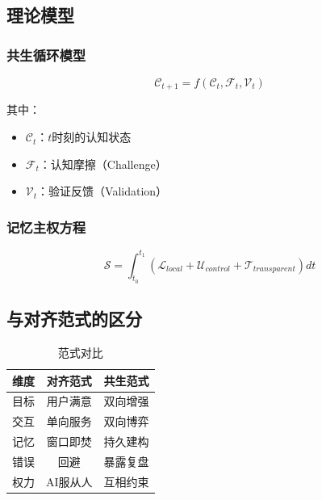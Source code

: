 \documentclass[12pt,a4paper]{article}
\begin{document}
\subsection{理论模型}

\subsubsection{共生循环模型}

\begin{equation}
\mathcal{C}_{t+1} = f(\mathcal{C}_t, \mathcal{F}_t, \mathcal{V}_t)
\end{equation}

其中：
\begin{itemize}
    \item $\mathcal{C}_t$：$t$时刻的认知状态
    \item $\mathcal{F}_t$：认知摩擦（Challenge）
    \item $\mathcal{V}_t$：验证反馈（Validation）
\end{itemize}

\subsubsection{记忆主权方程}

\begin{equation}
\mathcal{S} = \int_{t_0}^{t_1} \left( \mathcal{L}_{local} + \mathcal{U}_{control} + \mathcal{T}_{transparent} \right) dt
\end{equation}

\subsection{与对齐范式的区分}

\begin{table}[h]
\centering
\caption{范式对比}
\begin{tabular}{lcc}
\toprule
\textbf{维度} & \textbf{对齐范式} & \textbf{共生范式} \\
\midrule
目标 & 用户满意 & 双向增强 \\
交互 & 单向服务 & 双向博弈 \\
记忆 & 窗口即焚 & 持久建构 \\
错误 & 回避 & 暴露复盘 \\
权力 & AI服从人 & 互相约束 \\
\bottomrule
\end{tabular}
\end{table}

\end{document}
